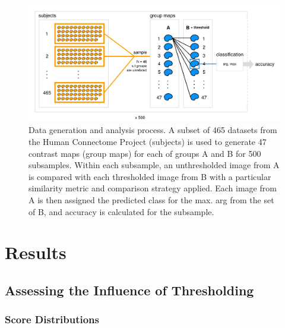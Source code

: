 \documentclass{report}
\begin{document}
\begin{figure}[ht!]
\begin{center}
\includegraphics[width=15cm]{images/figure21.png}
\end{center}
 \caption{\label{fig:21} Data generation and analysis process. A subset of 465 datasets from the Human Connectome Project (subjects) is used to generate 47 contrast maps (group maps) for each of groups A and B for 500 subsamples. Within each subsample, an unthresholded image from A is compared with each thresholded image from B with a particular similarity metric and comparison strategy applied.  Each image from A is then assigned the predicted class for the max. arg from the set of B, and accuracy is calculated for the subsample.}
\end{figure}

\section{Results}

\subsection{Assessing the Influence of Thresholding}

\subsubsection{Score Distributions}
\end{document}
